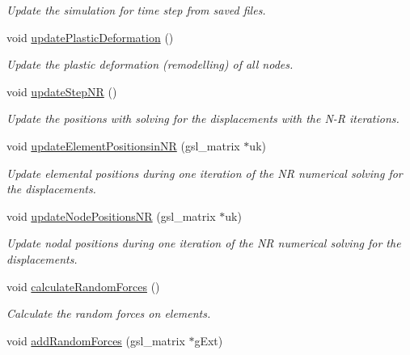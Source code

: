 \begin{DoxyCompactItemize}
\begin{DoxyCompactList}\small\item\em Update the simulation for time step from saved files. \end{DoxyCompactList}\item 
void \hyperlink{classSimulation_aba920b0ae2806ea3890cbe2b819977fe}{update\+Plastic\+Deformation} ()
\begin{DoxyCompactList}\small\item\em Update the plastic deformation (remodelling) of all nodes. \end{DoxyCompactList}\item 
void \hyperlink{classSimulation_a6a869cb433953d1d36249460b0a74545}{update\+Step\+N\+R} ()
\begin{DoxyCompactList}\small\item\em Update the positions with solving for the displacements with the N-\/\+R iterations. \end{DoxyCompactList}\item 
\hypertarget{classSimulation_aed6fc494b468ebd56c07625d3e5984ff}{}void \hyperlink{classSimulation_aed6fc494b468ebd56c07625d3e5984ff}{update\+Element\+Positionsin\+N\+R} (gsl\+\_\+matrix $\ast$uk)\label{classSimulation_aed6fc494b468ebd56c07625d3e5984ff}

\begin{DoxyCompactList}\small\item\em Update elemental positions during one iteration of the N\+R numerical solving for the displacements. \end{DoxyCompactList}\item 
void \hyperlink{classSimulation_aea943e8e0caf1b9ff8e40b61248024b6}{update\+Node\+Positions\+N\+R} (gsl\+\_\+matrix $\ast$uk)
\begin{DoxyCompactList}\small\item\em Update nodal positions during one iteration of the N\+R numerical solving for the displacements. \end{DoxyCompactList}\item 
\hypertarget{classSimulation_ae16977eb346093b2fe00f94e9c485b37}{}void \hyperlink{classSimulation_ae16977eb346093b2fe00f94e9c485b37}{calculate\+Random\+Forces} ()\label{classSimulation_ae16977eb346093b2fe00f94e9c485b37}

\begin{DoxyCompactList}\small\item\em Calculate the random forces on elements. \end{DoxyCompactList}\item 
\hypertarget{classSimulation_ad14662c0f9cee95a76c523130e8e688d}{}void \hyperlink{classSimulation_ad14662c0f9cee95a76c523130e8e688d}{add\+Random\+Forces} (gsl\+\_\+matrix $\ast$g\+Ext)\label{classSimulation_ad14662c0f9cee95a76c523130e8e688d}


\end{DoxyCompactItemize}
